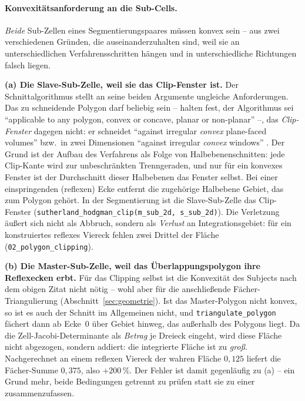 \documentclass[a4paper,11pt]{article}
\newcommand{\code}[1]{\texttt{\small #1}}
\newcommand{\file}[1]{\texttt{\small #1}}
\begin{document}
\paragraph{Konvexitätsanforderung an die Sub-Cells.}
\emph{Beide} Sub-Zellen eines Segmentierungspaares müssen konvex sein -- aus zwei verschiedenen
Gründen, die auseinanderzuhalten sind, weil sie an unterschiedlichen Verfahrensschritten hängen
und in unterschiedliche Richtungen falsch liegen.

\medskip
\noindent\textbf{(a) Die Slave-Sub-Zelle, weil sie das Clip-Fenster ist.} Der Schnittalgorithmus
stellt an seine beiden Argumente ungleiche Anforderungen. Das zu schneidende Polygon darf beliebig
sein -- \citet[S.~33]{sutherland1974} halten fest, der Algorithmus sei ``applicable to any polygon,
convex or concave, planar or non-planar'' --, das \emph{Clip-Fenster} dagegen nicht: er schneidet
``against irregular \emph{convex} plane-faced volumes'' bzw.\ in zwei Dimensionen ``against
irregular \emph{convex} windows'' \citep[S.~32]{sutherland1974}. Der Grund ist der Aufbau des
Verfahrens als Folge von Halbebenenschnitten: jede Clip-Kante wird zur unbeschränkten
Trenngeraden, und nur für ein konvexes Fenster ist der Durchschnitt dieser Halbebenen das Fenster
selbst. Bei einer einspringenden (reflexen) Ecke entfernt die zugehörige Halbebene Gebiet, das zum
Polygon gehört. In der Segmentierung ist die Slave-Sub-Zelle das Clip-Fenster
(\code{sutherland\_hodgman\_clip(m\_sub\_2d, s\_sub\_2d)}). Die Verletzung äußert sich nicht als
Abbruch, sondern als \emph{Verlust} an Integrationsgebiet: für ein konstruiertes reflexes Viereck
fehlen zwei Drittel der Fläche (\file{02\_polygon\_clipping}).

\medskip
\noindent\textbf{(b) Die Master-Sub-Zelle, weil das Überlappungspolygon ihre Reflexecken erbt.}
Für das Clipping selbst ist die Konvexität des Subjects nach dem obigen Zitat nicht nötig -- wohl
aber für die anschließende Fächer-Triangulierung (Abschnitt~\ref{sec:geometrie}). Ist das
Master-Polygon nicht konvex, so ist es auch der Schnitt im Allgemeinen nicht, und
\code{triangulate\_polygon} fächert dann ab Ecke~0 über Gebiet hinweg, das außerhalb des Polygons
liegt. Da die Zell-Jacobi-Determinante als \emph{Betrag} je Dreieck eingeht, wird diese Fläche
nicht abgezogen, sondern addiert: die integrierte Fläche ist zu \emph{groß}. Nachgerechnet an
einem reflexen Viereck der wahren Fläche $0{,}125$ liefert die Fächer-Summe $0{,}375$, also
$+200\,\%$. Der Fehler ist damit gegenläufig zu (a) -- ein Grund mehr, beide Bedingungen getrennt
zu prüfen statt sie zu einer zusammenzufassen.
\end{document}
